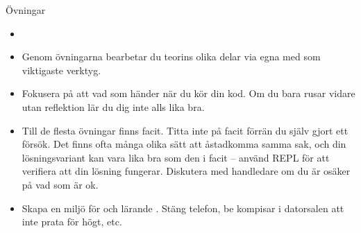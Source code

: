 \ifkompendium\else  %
\begin{SlideExtra}{Övningar}\SlideFontSmall
\begin{itemize}
  \item {}

\item Genom övningarna bearbetar du teorins olika delar via egna  med  som viktigaste verktyg.

\item Fokusera på att  vad som händer när du kör din kod. Om du bara rusar vidare utan reflektion lär du dig inte alls lika bra.

\item Till de flesta övningar finns facit. Titta inte på facit förrän du själv gjort ett försök. Det finns ofta många olika sätt att åstadkomma samma sak, och din lösningsvariant kan vara lika bra som den i facit -- använd REPL för att verifiera att din lösning fungerar. Diskutera med handledare om du är osäker på vad som är ok.

\item Skapa en miljö för  och lärande . Stäng telefon, be kompisar i datorsalen att inte prata för högt, etc.
\end{itemize}
\end{SlideExtra}

